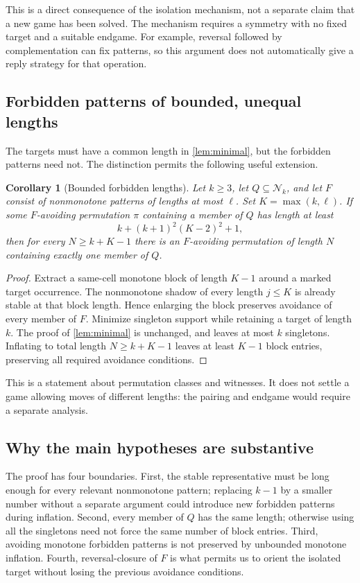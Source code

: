 \documentclass[11pt,a4paper]{article}
\newtheorem{corollary}[theorem]{Corollary}
\theoremstyle{definition}
\theoremstyle{remark}
\newcommand{\Nk}{\mathcal N_k}
\begin{document}
This is a direct consequence of the isolation mechanism, not a separate
claim that a new game has been solved. The mechanism requires a symmetry
with no fixed target and a suitable endgame. For example, reversal followed
by complementation can fix patterns, so this argument does not automatically
give a reply strategy for that operation.

\subsection{Forbidden patterns of bounded, unequal lengths}
The targets must have a common length in \cref{lem:minimal}, but the
forbidden patterns need not. The distinction permits the following useful
extension.

\begin{corollary}[Bounded forbidden lengths]\label{cor:mixedF}
Let $k\ge3$, let $Q\subseteq\Nk$, and let $F$ consist of nonmonotone
patterns of lengths at most $\ell$. Set $K=\max(k,\ell)$. If some
$F$-avoiding permutation $\pi$ containing a member of $Q$ has length at least
\[
 k+(k+1)^2(K-2)^2+1,
\]
then for every $N\ge k+K-1$ there is an $F$-avoiding permutation of length
$N$ containing exactly one member of $Q$.
\end{corollary}
\begin{proof}
Extract a same-cell monotone block of length $K-1$ around a marked target
occurrence. The nonmonotone shadow of every length $j\le K$ is already
stable at that block length. Hence enlarging the block preserves avoidance
of every member of $F$. Minimize singleton support while retaining a target
of length $k$. The proof of \cref{lem:minimal} is unchanged, and leaves at
most $k$ singletons. Inflating to total length $N\ge k+K-1$ leaves at least
$K-1$ block entries, preserving all required avoidance conditions.
\end{proof}

This is a statement about permutation classes and witnesses. It does not
settle a game allowing moves of different lengths: the pairing and endgame
would require a separate analysis.

\subsection{Why the main hypotheses are substantive}
The proof has four boundaries. First, the stable representative must be
long enough for every relevant nonmonotone pattern; replacing $k-1$ by a
smaller number without a separate argument could introduce new forbidden
patterns during inflation. Second, every member of $Q$ has the same length;
otherwise using all the singletons need not force the same number of block
entries. Third, avoiding monotone forbidden patterns is not preserved by
unbounded monotone inflation. Fourth, reversal-closure of $F$ is what
permits us to orient the isolated target without losing the previous
avoidance conditions.
\end{document}
